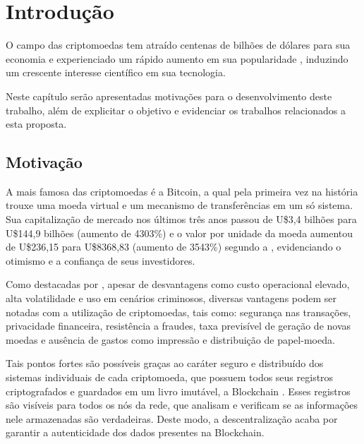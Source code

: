 \documentclass[openright]{normas-utf-tex} %
\begin{document}
\sumario %


%
%
%
%


\chapter{Introdução}
\label{chap:intro}

O campo das criptomoedas tem atraído centenas de bilhões de dólares para sua economia \cite{CoinMarketCap2018} e experienciado um rápido aumento em sua popularidade \cite{Judmayer2017}, induzindo um crescente interesse científico em sua tecnologia. 

Neste capítulo serão apresentadas motivações para o desenvolvimento deste trabalho, além de explicitar o objetivo e evidenciar os trabalhos relacionados a esta proposta. 

\section{Motivação}

A mais famosa das criptomoedas é a Bitcoin, a qual pela primeira vez na história trouxe uma moeda virtual e um mecanismo de transferências em um só sistema. Sua capitalização de mercado nos últimos três anos passou de U\$3,4 bilhões para U\$144,9 bilhões (aumento de 4303\%) e o valor por unidade da moeda aumentou de U\$236,15 para U\$8368,83 (aumento de 3543\%) segundo a , evidenciando o otimismo e a confiança de seus investidores.

Como destacadas por , apesar de desvantagens como custo operacional elevado, alta volatilidade e uso em cenários criminosos, diversas vantagens podem ser notadas com a utilização de criptomoedas, tais como: segurança nas transações, privacidade financeira, resistência a fraudes, taxa previsível de geração de novas moedas e ausência de gastos como impressão e distribuição de papel-moeda.

Tais pontos fortes são possíveis graças ao caráter seguro e distribuído dos sistemas individuais de cada criptomoeda, que possuem todos seus registros criptografados e guardados em um livro imutável, a Blockchain \cite{Mirzayi2017}. Esses registros são visíveis para todos os nós da rede, que analisam e verificam se as informações nele armazenadas são verdadeiras. Deste modo, a descentralização acaba por garantir a autenticidade dos dados presentes na Blockchain.
\end{document}
